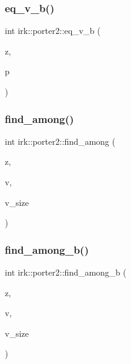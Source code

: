 \mbox{\label{namespaceirk_1_1porter2_ab1698c56d91dcf634517fabe22677bca}} 
\subsubsection{\texorpdfstring{eq\+\_\+v\+\_\+b()}{eq\_v\_b()}}
{\footnotesize\ttfamily int irk\+::porter2\+::eq\+\_\+v\+\_\+b (\begin{DoxyParamCaption}\item[{struct \mbox{\hyperlink{structirk_1_1porter2_1_1SN__env}{S\+N\+\_\+env}} $\ast$}]{z,  }\item[{const \mbox{\hyperlink{namespaceirk_1_1porter2_afd04c4eb58a1dabcf8f3ab2d7e9f9ed5}{symbol}} $\ast$}]{p }\end{DoxyParamCaption})}

\mbox{\label{namespaceirk_1_1porter2_a19066b3162016d678bc55492a893890c}} 
\subsubsection{\texorpdfstring{find\+\_\+among()}{find\_among()}}
{\footnotesize\ttfamily int irk\+::porter2\+::find\+\_\+among (\begin{DoxyParamCaption}\item[{struct \mbox{\hyperlink{structirk_1_1porter2_1_1SN__env}{S\+N\+\_\+env}} $\ast$}]{z,  }\item[{const struct \mbox{\hyperlink{structirk_1_1porter2_1_1among}{among}} $\ast$}]{v,  }\item[{int}]{v\+\_\+size }\end{DoxyParamCaption})}

\mbox{\label{namespaceirk_1_1porter2_ac4a1844fb3b50a716566e4107a4853da}} 
\subsubsection{\texorpdfstring{find\+\_\+among\+\_\+b()}{find\_among\_b()}}
{\footnotesize\ttfamily int irk\+::porter2\+::find\+\_\+among\+\_\+b (\begin{DoxyParamCaption}\item[{struct \mbox{\hyperlink{structirk_1_1porter2_1_1SN__env}{S\+N\+\_\+env}} $\ast$}]{z,  }\item[{const struct \mbox{\hyperlink{structirk_1_1porter2_1_1among}{among}} $\ast$}]{v,  }\item[{int}]{v\+\_\+size }\end{DoxyParamCaption})}

